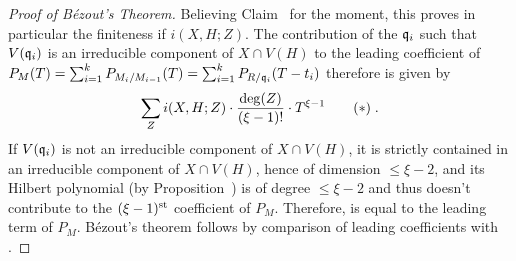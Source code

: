 \documentclass[a4paper,parskip=half,numbers=enddot, DIV=12]{scrreprt}
\begin{document}
\begin{proof}[Proof of B\'ezout's Theorem]
     Believing Claim~ for the moment, this proves in particular the finiteness if $i(X,H;Z)$. The contribution of the $\mathfrak{q}_i$ such that $V(\mathfrak{q}_i)$ is an irreducible component of $X\cap V(H)$ to the leading coefficient of $P_M (T) = \sum_{i=1}^k P_{M_i/M_{i-1}}(T) = \sum_{i=1}^k P_{R/\mathfrak{q}_i}(T-t_i)$ therefore is given by
    \begin{align*}
        \sum_{Z} i(X,H;Z) \cdot \frac{\deg(Z)}{(\xi-1)!}\cdot T^{\xi-1}\tag{$*$} \lbl{eq:bezoutLeadingCoeff}\;.
    \end{align*}
    If $V(\mathfrak{q}_i)$ is not an irreducible component of $X\cap V(H)$, it is strictly contained in an irreducible component of $X\cap V(H)$, hence of dimension $\leq\xi-2$, and its Hilbert polynomial (by Proposition~) is of degree $\leq\xi-2$ and thus doesn't contribute to the $(\xi-1)^{\text{st}}$ coefficient of $P_M$. Therefore,  is equal to the leading term of $P_M$. B\'ezout's theorem follows by comparison of leading coefficients with .
    

\end{proof}
\end{document}
